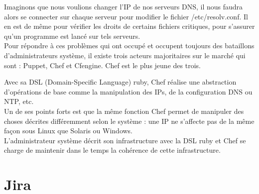 Imaginons que nous voulions changer l'IP de nos serveurs DNS, il nous faudra
alors se connecter sur chaque serveur pour modifier le fichier
/etc/resolv.conf. Il en est de même pour vérifier les droits de certains
fichiers critiques, pour s'assurer qu'un programme est lancé sur tels
serveurs.\\

Pour répondre à ces problèmes qui ont occupé et occupent toujours des bataillons
d'administrateurs système, il existe trois acteurs majoritaires sur le marché
qui sont : Puppet, Chef et Cfengine. Chef est le plus jeune des trois. 

Avec sa DSL (Domain-Specific Language) ruby, Chef réalise une abstraction
d'opérations de base comme la manipulation des IPs, de la configuration DNS ou
NTP, etc. \\
Un de ses points forts est que la même fonction Chef permet de manipuler des
choses décrites différemment selon le système : une IP ne s'affecte pas de la
même façon sous Linux que Solaris ou Windows.\\
L'administrateur système décrit son infrastructure avec la DSL ruby et Chef
se charge de maintenir dans le temps la cohérence de cette infrastructure.





\section{Jira}


